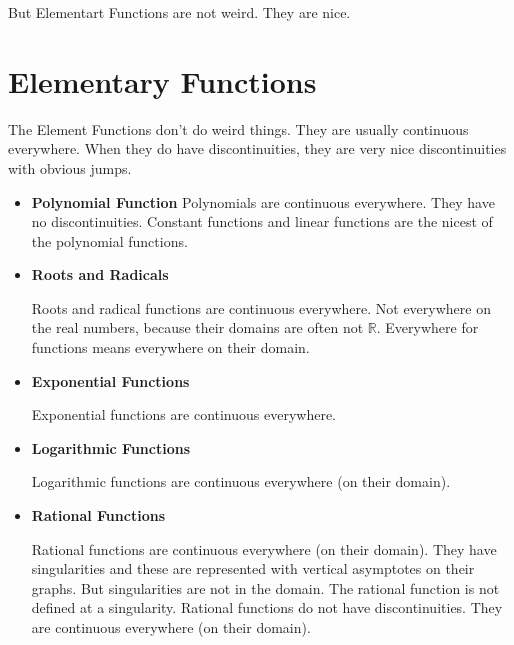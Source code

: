 \documentclass{ximera}
\begin{document}
But Elementart Functions are not weird.  They are nice.  



\section{Elementary Functions}




The Element Functions don't do weird things.  They are usually continuous everywhere.  When they do have discontinuities, they are very nice discontinuities with obvious jumps.






\begin{itemize} 

\item \textbf{Polynomial Function}  Polynomials are continuous everywhere. They have no discontinuities. Constant functions and linear functions are the nicest of the polynomial functions.





\item \textbf{Roots and Radicals}

Roots and radical functions are continuous everywhere.  Not everywhere on the real numbers, because their domains are often not $\mathbb{R}$. Everywhere for functions means everywhere on their domain.






\item \textbf{Exponential Functions}

Exponential functions are continuous everywhere.





\item \textbf{Logarithmic Functions}

Logarithmic functions are continuous everywhere (on their domain).






\item \textbf{Rational Functions}

Rational functions are continuous everywhere (on their domain).  They have singularities and these are represented with vertical asymptotes on their graphs.  But singularities are not in the domain.  The rational function is not defined at a singularity. Rational functions do not have discontinuities.  They are continuous everywhere (on their domain). 






\end{itemize}
\end{document}
